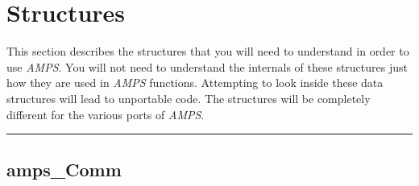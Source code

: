 
\newpage

\section{Structures}
\label{Structures}


This section describes the structures that you will need to understand
in order to use {\em AMPS}.  You will not need to understand the
internals of these structures just how they are used in {\em AMPS}
functions.  Attempting to look inside these data structures will lead
to unportable code.  The structures will be completely different for the
various ports of {\em AMPS}.


\noindent\rule{\textwidth}{1mm}

\subsection{amps\_Comm}
\label{amps_Comm}


